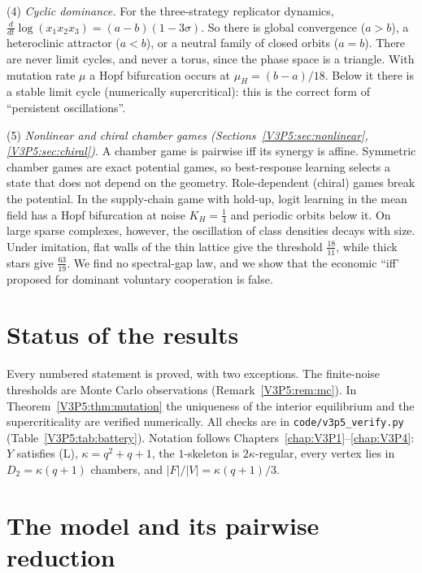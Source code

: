 \begin{chapterabstract}
(4) \emph{Cyclic dominance.} For the three-strategy replicator dynamics,
$\frac{d}{dt}\log(x_1x_2x_3)=(a-b)(1-3\sigma)$. So there is global convergence ($a>b$), a
heteroclinic attractor ($a<b$), or a neutral family of closed orbits ($a=b$). There are never
limit cycles, and never a torus, since the phase space is a triangle. With mutation rate
$\mu$ a Hopf bifurcation occurs at $\mu_H=(b-a)/18$. Below it there is a stable limit cycle
(numerically supercritical): this is the correct form of ``persistent oscillations''.

(5) \emph{Nonlinear and chiral chamber games (Sections~\ref{V3P5:sec:nonlinear},
\ref{V3P5:sec:chiral}).} A chamber game is pairwise iff its synergy is affine. Symmetric
chamber games are exact potential games, so best-response learning selects a state that does not
depend on the geometry. Role-dependent (chiral) games break the potential. In the
supply-chain game with hold-up, logit learning in the mean field has a Hopf bifurcation at noise
$K_H=\frac14$ and periodic orbits below it. On large sparse complexes, however, the
oscillation of class densities decays with size. Under imitation, flat walls of the thin
lattice give the threshold $\frac{18}{11}$, while thick stars give $\frac{63}{19}$. We find no
spectral-gap law, and we show that the economic ``iff' proposed for dominant voluntary
cooperation is false.
\end{chapterabstract}

\section*{Status of the results}

Every numbered statement is proved, with two exceptions. The finite-noise thresholds are
Monte Carlo observations (Remark~\ref{V3P5:rem:mc}). In Theorem~\ref{V3P5:thm:mutation} the
uniqueness of the interior equilibrium and the supercriticality are verified numerically. All
checks are in \texttt{code/v3p5\_verify.py} (Table~\ref{V3P5:tab:battery}). Notation follows
Chapters~\ref{chap:V3P1}--\ref{chap:V3P4}: $Y$ satisfies (L), $\kappa=q^{2}+q+1$, the $1$-skeleton is $2\kappa$-regular,
every vertex lies in $D_2=\kappa(q+1)$ chambers, and $|F|/|V|=\kappa(q+1)/3$.

\section{The model and its pairwise reduction}\label{V3P5:sec:model}

